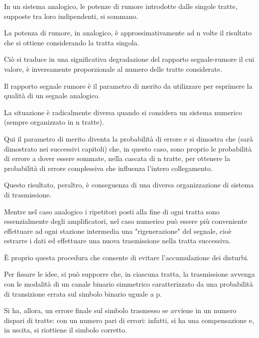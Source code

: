 In un sistema analogico, le potenze di rumore introdotte dalle singole tratte, supposte tra loro indipendenti, si sommano. \newline 

La potenza di rumore, in analogico, è approssimativamente ad n volte il risultato che si ottiene considerando la tratta singola. \newline 

Ciò si traduce in una significativa degradazione del rapporto segnale-rumore il cui valore, 
è inversamente proporzionale al numero delle tratte considerate. \newline 

Il rapporto segnale rumore è il parametro di merito da utilizzare per esprimere la qualità di un segnale analogico. \newline 

La situazione è radicalmente diversa quando si considera un sistema numerico (sempre organizzato in n tratte). \newline 

Qui il parametro di merito diventa la probabilità di errore e si dimostra che (sarà dimostrato nei successivi capitoli) che, in questo caso, 
sono proprio le probabilità di errore a dover essere sommate, nella cascata di n tratte, per ottenere la probabilità di errore complessiva che influenza l'intero collegamento. \newline 

Questo risultato, peraltro, è conseguenza di una diversa organizzazione di sistema di trasmissione. \newline 

Mentre nel caso analogico i ripetitori posti alla fine di ogni tratta sono essenzialmente degli amplificatori, 
nel caso numerico può essere più conveniente effettuare ad ogni stazione intermedia una "rigenerazione" del segnale, 
cioè estrarre i dati ed effettuare una nuova trasmissione nella tratta successiva. \newline 

È proprio questa procedura che consente di evitare l'accumulazione dei disturbi. \newline 

Per fissare le idee, si può supporre che, in ciascuna tratta, la trasmissione avvenga con le modalità di un canale binario simmetrico caratterizzato da una probabilità di transizione errata 
sul simbolo binario uguale a p. \newline 

Si ha, allora, un errore finale sul simbolo trasmesso se avviene in un numero dispari di tratte: 
con un numero pari di errori: infatti, si ha una compensazione e, in uscita, si riottiene il simbolo corretto. \newline 

